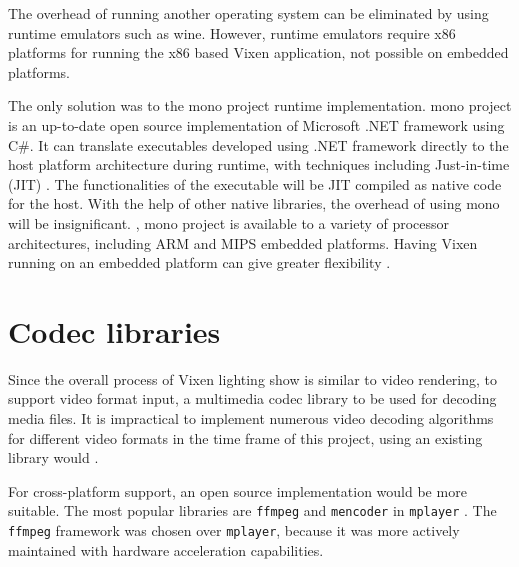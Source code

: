The overhead of running another operating system can be eliminated by using runtime emulators such as wine. However, runtime emulators require x86 platforms for running the x86 based Vixen application,  not possible on  embedded platforms.

The only  solution was to  the mono project runtime implementation.  mono project is an up-to-date open source implementation of Microsoft .NET framework using C\#. It can translate executables developed using .NET framework directly to the host platform architecture during runtime, with techniques including Just-in-time (JIT) . The functionalities of the executable will be JIT compiled as native code for the host. With the help of other native libraries, the overhead of using mono  will be insignificant. , mono project is available to a variety of processor architectures, including ARM and MIPS embedded platforms. Having Vixen running on an embedded platform can give greater flexibility .

\section{Codec libraries}

Since the overall process of  Vixen lighting show is similar to video rendering, to support video format input, a multimedia codec library  to be used for decoding media files. It is impractical to implement numerous video decoding algorithms for different video formats in the time frame of this project, using an existing library would .

For cross-platform support, an open source implementation would be more suitable. The most popular libraries are \texttt{ffmpeg} \cite{ffmpeg} and \texttt{mencoder} in \texttt{mplayer} \cite{mplayer}. The \texttt{ffmpeg} framework was chosen over \texttt{mplayer}, because it was more actively maintained with  hardware acceleration capabilities.


